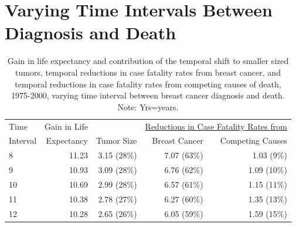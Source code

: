 \documentclass[11pt,letterpaper]{article}
\theoremstyle{plain}
\theoremstyle{remark}
\numberwithin{equation}{section}
\begin{document}
\section{Varying Time Intervals Between Diagnosis and Death}
\begin{center}
  \begin{table}[h]
\begin{tabular}{@{}l rrrr@{}}
  Time & Gain in Life & &
                                \multicolumn{2}{c}{\underline{Reductions
                                in Case Fatality Rates from}}\\
  Interval & Expectancy & Tumor Size  & Breast Cancer   & Competing Causes  \\ 
  \midrule
  8  & 11.23 & 3.15 (28\%) & 7.07 (63\%) & 1.03 (9\%) \\ 
  9  & 10.93 & 3.09 (28\%) & 6.76 (62\%) & 1.09 (10\%) \\ 
  10  & 10.69 & 2.99 (28\%) & 6.57 (61\%) & 1.15 (11\%) \\ 
  11  & 10.38 & 2.78 (27\%) & 6.27 (60\%) & 1.35 (13\%) \\ 
  12  & 10.28 & 2.65 (26\%) & 6.05 (59\%) & 1.59 (15\%) \\ 
  \bottomrule
\end{tabular}
\caption{Gain in life expectancy and contribution of the temporal shift to smaller sized tumors, temporal reductions in case fatality rates from breast cancer, and temporal reductions in case fatality rates from
  competing causes of death, 1975-2000, varying time interval between breast
  cancer diagnosis and death.  Note: Yrs=years.}
\end{table}
\end{center}

\newpage{} 

\end{document}
